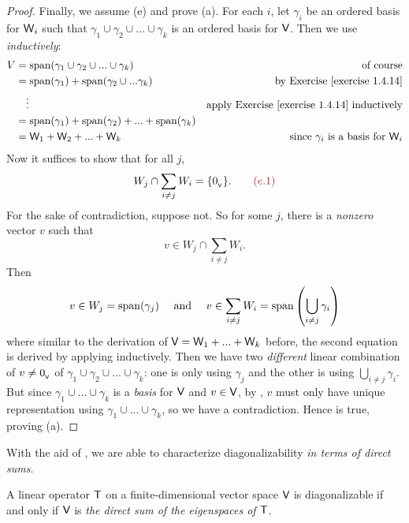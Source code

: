 \begin{proof}
Finally, we assume (e) and prove (a).
For each \(i\), let \(\gamma_i\) be an ordered basis for \(\textsf{W}_i\) such that \(\gamma_1 \cup \gamma_2 \cup ... \cup \gamma_k\) is an ordered basis for \(\textsf{V}\).
Then we use  \emph{inductively}:
\begin{align*}
    V & = \spann(\gamma_1 \cup \gamma_2 \cup ... \cup \gamma_k) & \text{of course} \\
      & = \spann(\gamma_1) + \spann(\gamma_2 \cup ... \gamma_k) & \text{by \EXEC{1.4.14}} \\
      & \quad \vdots & \text{apply \EXEC{1.4.14} inductively} \\
      & = \spann(\gamma_1) + \spann(\gamma_2) + ... + \spann(\gamma_k) \\
      & = \W_1 + \W_2 + ... + \W_k & \text{since \(\gamma_i\) is a basis for \(\W_i\)}
\end{align*}
Now it suffices to show that for all \(j\),
\[
    W_j \cap \sum_{i \ne j} W_{i} = \{ \OV \}. \quad \quad \MAROON{(e.1)}
\]
For the sake of contradiction, suppose not.
So for some \(j\), there is a \emph{nonzero} vector \(v\) such that
\[
    v \in W_j \cap \sum_{i \ne j} W_i.
\]
Then
\[
    v \in W_j = \operatorname{span}(\gamma_j)
    \quad \text{ and } \quad
    v \in \sum_{i \ne j} W_i = \operatorname{span} \left( \bigcup_{i \ne j} \gamma_i \right)
\]
where similar to the derivation of \(\textsf{V} = \textsf{W}_1 + ... + \textsf{W}_k\) before, the second equation is derived by applying  inductively.
Then we have two \emph{different} linear combination of \(v \ne 0_{_{\textsf{V}}}\) of \(\gamma_1 \cup \gamma_2 \cup ... \cup \gamma_k\): one is only using \(\gamma_j\) and the other is using \(\bigcup_{i \ne j} \gamma_i\).
But since \(\gamma_1 \cup ... \cup \gamma_k\) is a \emph{basis} for \(\textsf{V}\) and \(v \in \textsf{V}\), by , \(v\) must only have unique representation using \(\gamma_1 \cup ... \cup \gamma_k\), so we have a contradiction.
Hence  is true, proving (a).
\end{proof}

With the aid of , we are able to characterize diagonalizability \emph{in terms of direct sums}.

\begin{theorem} \label{thm 5.10}
A linear operator \(\textsf{T}\) on a finite-dimensional vector space \(\textsf{V}\) is diagonalizable if and only if \(\textsf{V}\) is \emph{the direct sum of the eigenspaces of \(\textsf{T}\)}.
\end{theorem}

